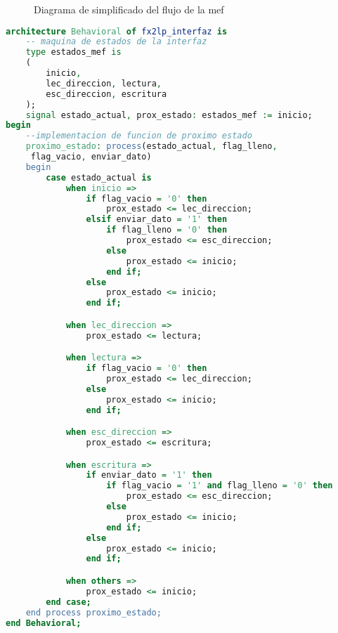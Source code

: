 \begin{figure}[!hb]
	\caption{Diagrama de simplificado del flujo de la \acrshort{mef}}
	\label{fpga:mef:simple}
\end{figure}

\begin{lstlisting}[language=VHDL,backgroundcolor=\color{gray!30}]
architecture Behavioral of fx2lp_interfaz is
	-- maquina de estados de la interfaz
	type estados_mef is
	(
		inicio,
		lec_direccion, lectura,
		esc_direccion, escritura
	);
	signal estado_actual, prox_estado: estados_mef := inicio;
begin
	--implementacion de funcion de proximo estado
	proximo_estado: process(estado_actual, flag_lleno,
	 flag_vacio, enviar_dato)
	begin
		case estado_actual is
			when inicio =>
				if flag_vacio = '0' then
					prox_estado <= lec_direccion;
				elsif enviar_dato = '1' then
					if flag_lleno = '0' then
						prox_estado <= esc_direccion;
					else
						prox_estado <= inicio;
					end if;
				else
					prox_estado <= inicio;
				end if;

			when lec_direccion =>
				prox_estado <= lectura;

			when lectura =>
				if flag_vacio = '0' then
					prox_estado <= lec_direccion;
				else
					prox_estado <= inicio;
				end if;

			when esc_direccion =>
				prox_estado <= escritura;

			when escritura =>
				if enviar_dato = '1' then
					if flag_vacio = '1' and flag_lleno = '0' then
						prox_estado <= esc_direccion;
					else
						prox_estado <= inicio;
					end if;
				else
					prox_estado <= inicio;
				end if;

			when others =>
				prox_estado <= inicio;
		end case;
	end process proximo_estado;
end Behavioral;
\end{lstlisting}


